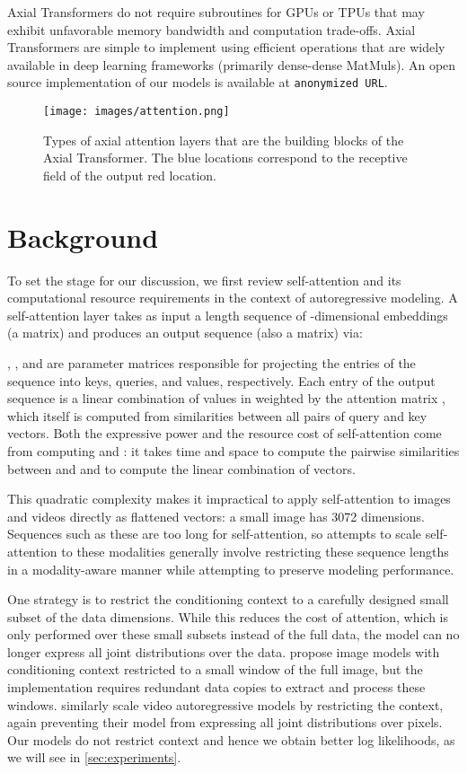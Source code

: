 \documentclass{article} \usepackage{iclr2020_conference,times}
\begin{document}
Axial Transformers do not require subroutines for GPUs or TPUs that may exhibit unfavorable memory bandwidth and computation trade-offs. Axial Transformers are simple to implement using efficient operations that are widely available in deep learning frameworks (primarily dense-dense MatMuls). An open source implementation of our models is available at \texttt{anonymized URL}. 



\begin{figure}[t]
    \centering
    \texttt{[image: images/attention.png]}
    \caption{Types of axial attention layers that are the building blocks of the Axial Transformer. The blue locations correspond to the receptive field of the output red location.}
    \label{fig:attention_building_blocks}
\end{figure}

\section{Background}


To set the stage for our discussion, we first review self-attention and its computational resource requirements in the context of autoregressive modeling. A self-attention layer takes as input a length  sequence of -dimensional embeddings  (a  matrix) and produces an output sequence  (also a  matrix) via:

, , and  are  parameter matrices responsible for projecting the entries of the sequence  into keys, queries, and values, respectively. Each entry of the output sequence  is a linear combination of values in  weighted by the attention matrix , which itself is computed from similarities between all pairs of query and key vectors.
Both the expressive power and the resource cost of self-attention come from computing  and : it takes  time and space to compute the pairwise similarities between  and  and to compute the linear combination of  vectors.

This quadratic complexity makes it impractical to apply self-attention to images and videos directly as flattened vectors: a small  image has 3072 dimensions. Sequences such as these are too long for self-attention, so attempts to scale self-attention to these modalities generally involve restricting these sequence lengths in a modality-aware manner while attempting to preserve modeling performance.

One strategy is to restrict the conditioning context  to a carefully designed small subset of the data dimensions. While this reduces the cost of attention, which is only performed over these small subsets instead of the full data, the model can no longer  express all joint distributions over the data. \citet{parmar2018image} propose image models with conditioning context  restricted to a small window of the full image, but the implementation requires redundant data copies to extract and process these windows. \citet{weissenborn2019scaling} similarly scale video autoregressive models by restricting the context, again preventing their model from expressing all joint distributions over pixels. Our models do not restrict context and hence we obtain better log likelihoods, as we will see in \cref{sec:experiments}.
\end{document}
